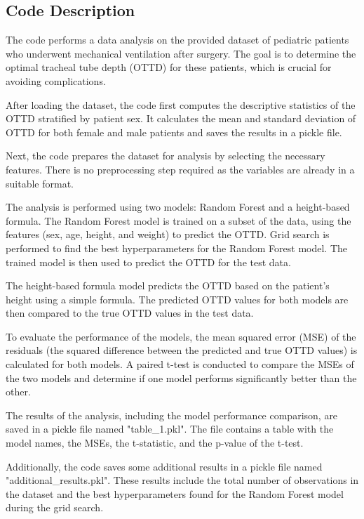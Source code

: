 \documentclass[11pt]{article}
\begin{document}
\subsection{Code Description}

The code performs a data analysis on the provided dataset of pediatric patients who underwent mechanical ventilation after surgery. The goal is to determine the optimal tracheal tube depth (OTTD) for these patients, which is crucial for avoiding complications.

After loading the dataset, the code first computes the descriptive statistics of the OTTD stratified by patient sex. It calculates the mean and standard deviation of OTTD for both female and male patients and saves the results in a pickle file.

Next, the code prepares the dataset for analysis by selecting the necessary features. There is no preprocessing step required as the variables are already in a suitable format.

The analysis is performed using two models: Random Forest and a height-based formula. The Random Forest model is trained on a subset of the data, using the features (sex, age, height, and weight) to predict the OTTD. Grid search is performed to find the best hyperparameters for the Random Forest model. The trained model is then used to predict the OTTD for the test data.

The height-based formula model predicts the OTTD based on the patient's height using a simple formula. The predicted OTTD values for both models are then compared to the true OTTD values in the test data.

To evaluate the performance of the models, the mean squared error (MSE) of the residuals (the squared difference between the predicted and true OTTD values) is calculated for both models. A paired t-test is conducted to compare the MSEs of the two models and determine if one model performs significantly better than the other.

The results of the analysis, including the model performance comparison, are saved in a pickle file named "table\_1.pkl". The file contains a table with the model names, the MSEs, the t-statistic, and the p-value of the t-test.

Additionally, the code saves some additional results in a pickle file named "additional\_results.pkl". These results include the total number of observations in the dataset and the best hyperparameters found for the Random Forest model during the grid search.
\end{document}
